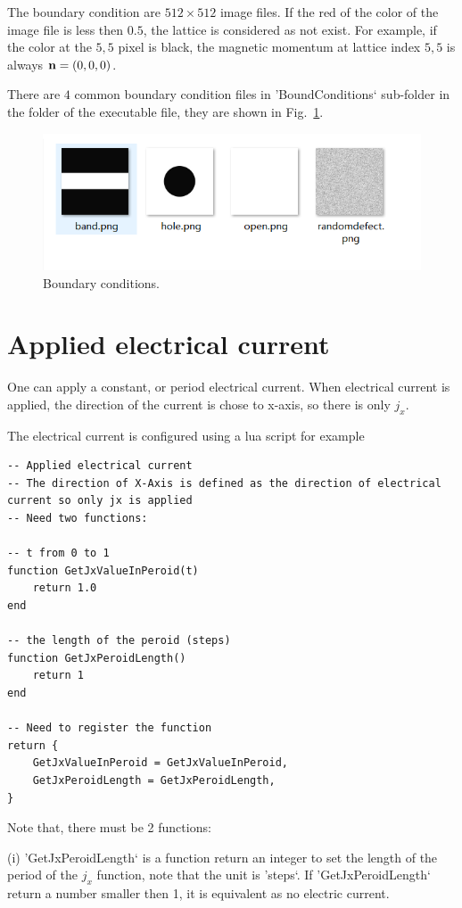 \documentclass[aps,superscriptaddress,groupedaddress]{revtex4}  %
\begin{document}
The boundary condition are $512\times 512$ image files. If the red of the color of the image file is less then $0.5$, the lattice is considered as not exist. For example, if the color at the $5, 5$ pixel is black, the magnetic momentum at lattice index $5,5$ is always ${\bf n}=(0,0,0)$.

There are $4$ common boundary condition files in 'BoundConditions` sub-folder in the folder of the executable file, they are shown in Fig.~\ref{Fig:boundary}.
\begin{figure}
\includegraphics[scale=0.5]{boundary.png}
\caption{\label{Fig:boundary}Boundary conditions.}
\end{figure}

\section{\label{sec:5}Applied electrical current}

One can apply a constant, or period electrical current. When electrical current is applied, the direction of the current is chose to x-axis, so there is only $j_x$.

The electrical current is configured using a lua script for example
\begin{lstlisting}
-- Applied electrical current
-- The direction of X-Axis is defined as the direction of electrical current so only jx is applied
-- Need two functions:

-- t from 0 to 1
function GetJxValueInPeroid(t)
    return 1.0
end

-- the length of the peroid (steps)
function GetJxPeroidLength()
    return 1
end

-- Need to register the function
return {
    GetJxValueInPeroid = GetJxValueInPeroid,
    GetJxPeroidLength = GetJxPeroidLength,
}
\end{lstlisting}

Note that, there must be 2 functions:

(i) 'GetJxPeroidLength` is a function return an integer to set the length of the period of the $j_x$ function, note that the unit is 'steps`. If 'GetJxPeroidLength` return a number smaller then 1, it is equivalent as no electric current.
\end{document}
